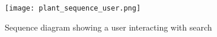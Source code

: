 \documentclass{llncs}
\begin{document}

\begin{figure}[p]
  \begin{center}
    \texttt{[image: plant\_sequence\_user.png]}
  \end{center}
  \caption{Sequence diagram showing a user interacting with search\label{sequence-user}}
\end{figure}
\end{document}
